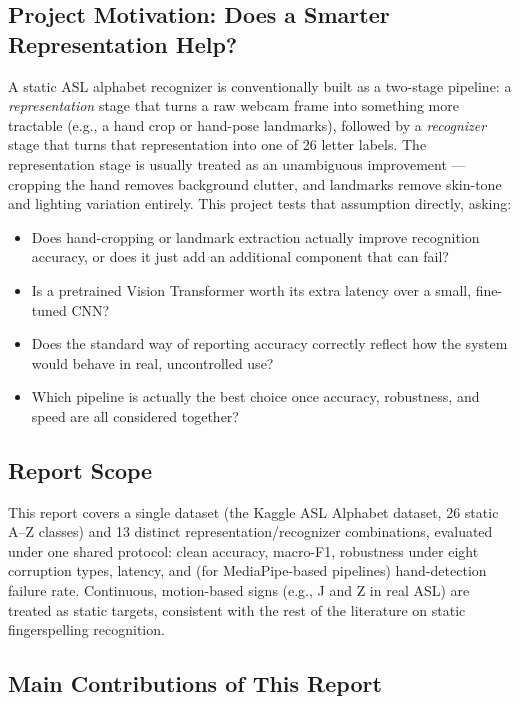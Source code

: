 \documentclass[11pt,a4paper]{article}
\begin{document}
\subsection{Project Motivation: Does a Smarter Representation Help?}

A static ASL alphabet recognizer is conventionally built as a two-stage
pipeline: a \emph{representation} stage that turns a raw webcam frame into
something more tractable (e.g., a hand crop or hand-pose landmarks), followed
by a \emph{recognizer} stage that turns that representation into one of 26
letter labels. The representation stage is usually treated as an unambiguous
improvement --- cropping the hand removes background clutter, and landmarks
remove skin-tone and lighting variation entirely. This project tests that
assumption directly, asking:

\begin{itemize}[leftmargin=1.4em]
  \item Does hand-cropping or landmark extraction actually improve recognition
        accuracy, or does it just add an additional component that can fail?
  \item Is a pretrained Vision Transformer worth its extra latency over a
        small, fine-tuned CNN?
  \item Does the standard way of reporting accuracy correctly reflect how the
        system would behave in real, uncontrolled use?
  \item Which pipeline is actually the best choice once accuracy,
        robustness, and speed are all considered together?
\end{itemize}

\subsection{Report Scope}

This report covers a single dataset (the Kaggle ASL Alphabet dataset, 26
static A--Z classes) and 13 distinct representation/recognizer combinations,
evaluated under one shared protocol: clean accuracy, macro-F1, robustness
under eight corruption types, latency, and (for MediaPipe-based pipelines)
hand-detection failure rate. Continuous, motion-based signs (e.g., J and Z in
real ASL) are treated as static targets, consistent with the rest of the
literature on static fingerspelling recognition.

\subsection{Main Contributions of This Report}
\end{document}
